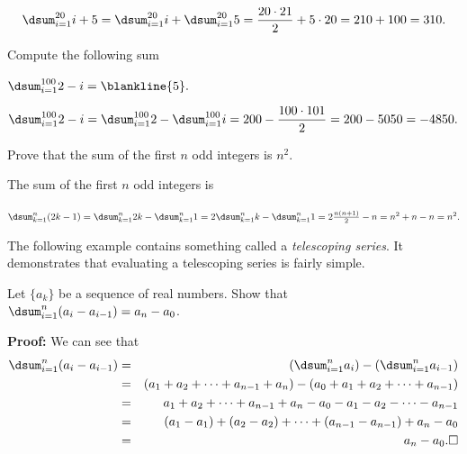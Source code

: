 \begin{exa}
$$\dsum_{i=1}^{20} i+5 = \dsum_{i=1}^{20} i+ \dsum_{i=1}^{20} 5 = \frac{20\cdot 21}{2}+5\cdot 20 = 210+100=310.$$
\end{exa}

\begin{exer}
Compute the following sum

\noindent
$\dsum_{i=1}^{100} 2 - i = \blankline{5}.$
\begin{answer}
$\dsum_{i=1}^{100} 2 - i =\dsum_{i=1}^{100} 2 - \dsum_{i=1}^{100} i
=200 - \dfrac{100\cdot 101}{2} = 200-5050 = -4850.$
\end{answer}
\end{exer}


\begin{exer}
Prove that the sum of the first $n$ odd integers is $n^2$.

\vspace*{1.5in}
\begin{answer}
The sum of the first $n$ odd integers is

\noindent
$\dsum_{k=1}^{n}(2k-1)=
\dsum_{k=1}^{n}2k-\dsum_{k=1}^{n}1=
2\dsum_{k=1}^{n}k-\dsum_{k=1}^{n}1=
2\frac{n(n+1)}{2}-n=n^2+n-n=n^2.
$
\end{answer}
\end{exer}

The following example contains something called a {\em telescoping series}.
It demonstrates that evaluating a telescoping series is fairly simple.

\begin{exa}
Let $\{a_k\}$ be a sequence of real numbers.
Show that $\dsum_{i=1}^{n}(a_i-a_{i-1})=a_n-a_0$.

{\bf Proof: }
We can see that 
\begin{eqnarray*}
\dsum_{i=1}^{n}(a_i-a_{i-1})
&=&\left(\dsum_{i=1}^{n}a_i\right)-\left(\dsum_{i=1}^{n}a_{i-1}\right)\\
&=&(a_1+a_2+\cdots+a_{n-1}+a_n)-(a_0+a_1+a_2+\cdots +a_{n-1})\\
&=&a_1+a_2+\cdots+a_{n-1}+a_n-a_0-a_1-a_2-\cdots -a_{n-1}\\
&=&(a_1-a_1)+(a_2-a_2)+\cdots+(a_{n-1}-a_{n-1})+a_n -a_0\\
&=&a_n-a_0.\square
\end{eqnarray*}
\end{exa}



